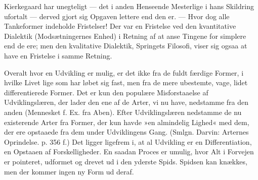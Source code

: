 \documentclass[12pt,a4paper,openany]{book}
\newcommand{\opage}[1]{\marginnote{\footnotesize\textit{[#1]}}}
\begin{document}
Kierkegaard har unegteligt --- det i anden Henseende
Mesterlige i hans Skildring ufortalt --- derved gjort sig
Opgaven lettere end den er. --- Hvor dog alle Tankeformer
indeholde Fristelser! Der var en Fristelse ved
den kvantitative Dialektik (Modsætningernes Enhed) i
Retning af at anse Tingene for simplere end de ere;
men den kvalitative Dialektik, Springets Filosofi, viser
sig ogsaa at have en Fristelse i samme Retning.

Overalt hvor en Udvikling er mulig, er det ikke fra
de fuldt færdige Former, i hvilke Livet lige som har
løbet sig fast, men fra de mere ubestemte, vage, lidet
differentierede Former. Det er kun den populære Misforstaaelse
af Udviklingslæren, der lader den ene af de Arter,
vi nu have, nedstamme fra den anden (Mennesket f. Ex.
fra Aben). Efter Udviklingslæren nedstamme de nu
existerende Arter fra Former, der kun havde »en almindelig
Lighed« med dem, der ere opstaaede fra dem under
Udviklingens Gang. (Smlgn. Darvin: Arternes Oprindelse.
p. 356 f.) Det ligger ligefrem i, at al Udvikling
er en Differentiation, en Opstaaen af Forskelligheder.
\opage{91}En saadan Proces er umulig, hvor Alt i Forvejen er
pointeret, udformet og drevet ud i den yderste Spids.
Spidsen kan knækkes, men der kommer ingen ny Form
ud deraf.
\end{document}
